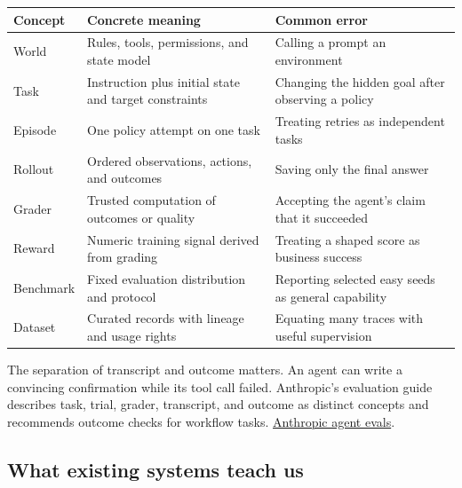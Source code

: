 \documentclass[
  11pt,
  letterpaper,
]{article}
\newcounter{none} %
\begin{document}
{\def\LTcaptype{none} %
\begin{longtable}[]{@{}
  >{\raggedright\arraybackslash}p{}
  >{\raggedright\arraybackslash}p{}
  >{\raggedright\arraybackslash}p{}@{}}
\toprule\noalign{}
\begin{minipage}[b]{\linewidth}\raggedright
Concept
\end{minipage} & \begin{minipage}[b]{\linewidth}\raggedright
Concrete meaning
\end{minipage} & \begin{minipage}[b]{\linewidth}\raggedright
Common error
\end{minipage} \\
\midrule\noalign{}
\endhead
\bottomrule\noalign{}
\endlastfoot
World & Rules, tools, permissions, and state model & Calling a prompt an
environment \\
Task & Instruction plus initial state and target constraints & Changing
the hidden goal after observing a policy \\
Episode & One policy attempt on one task & Treating retries as
independent tasks \\
Rollout & Ordered observations, actions, and outcomes & Saving only the
final answer \\
Grader & Trusted computation of outcomes or quality & Accepting the
agent's claim that it succeeded \\
Reward & Numeric training signal derived from grading & Treating a
shaped score as business success \\
Benchmark & Fixed evaluation distribution and protocol & Reporting
selected easy seeds as general capability \\
Dataset & Curated records with lineage and usage rights & Equating many
traces with useful supervision \\
\end{longtable}
}

The separation of transcript and outcome matters. An agent can write a
convincing confirmation while its tool call failed. Anthropic's
evaluation guide describes task, trial, grader, transcript, and outcome
as distinct concepts and recommends outcome checks for workflow tasks.
\href{https://www.anthropic.com/engineering/demystifying-evals-for-ai-agents}{Anthropic
agent evals}.

\subsection{What existing systems teach
us}\label{what-existing-systems-teach-us}
\end{document}
